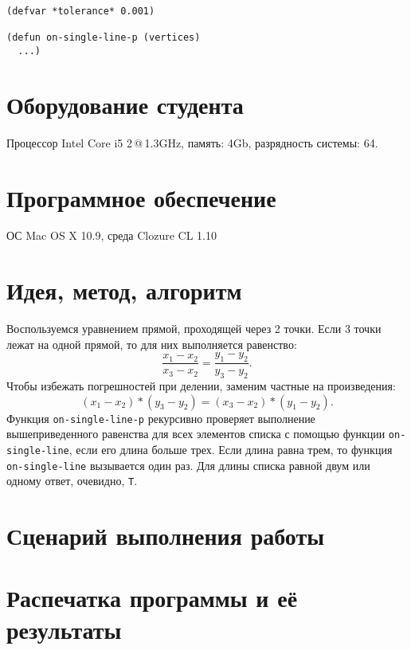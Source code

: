\documentclass[a4paper, 12pt]{article}
\begin{document}
\begin{lstlisting}
(defvar *tolerance* 0.001)

(defun on-single-line-p (vertices)
  ...)
\end{lstlisting}


\section{Оборудование студента}
Процессор Intel Core i5 2\,@\,1.3GHz, память: 4Gb, разрядность системы: 64.


\section{Программное обеспечение}
ОС Mac OS X 10.9, среда Clozure CL 1.10


\section{Идея, метод, алгоритм}
Воспользуемся уравнением прямой, проходящей через 2 точки. Если 3 точки лежат на одной прямой, то для них выполняется равенство:
$$\frac{x_1 - x_2}{x_3 - x_2} = \frac{y_1 - y_2}{y_3 -y_2}.$$
Чтобы избежать погрешностей при делении, заменим частные на произведения:
$$(x_1 - x_2)*(y_3 - y_2) = (x_3 - x_2)*(y_1 - y_2).$$
Функция {\tt on-single-line-p} рекурсивно проверяет выполнение вышеприведенного равенства для всех элементов списка с помощью функции {\tt on-single-line}, если его длина больше трех. Если длина равна трем, то функция {\tt on-single-line} вызывается один раз. Для длины списка равной двум или одному ответ, очевидно, {\tt T}.

\section{Сценарий выполнения работы}


\section{Распечатка программы и её результаты}
\end{document}
